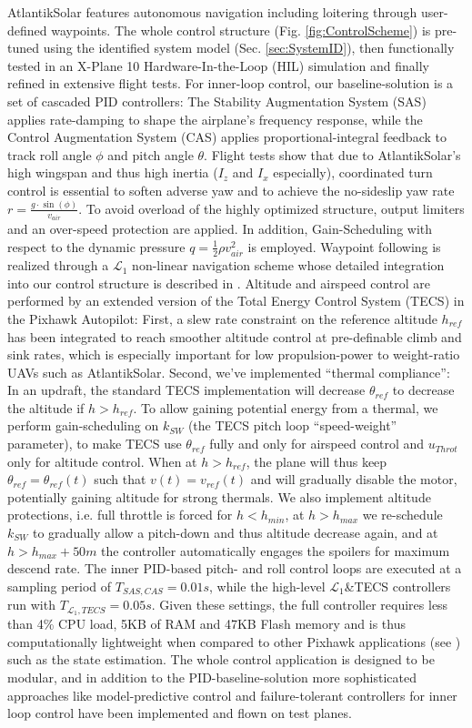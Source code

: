 AtlantikSolar features autonomous navigation including loitering through user-defined waypoints. The whole control structure (Fig. \ref{fig:ControlScheme}) is pre-tuned using the identified system model (Sec. \ref{sec:SystemID}), then functionally tested in an X-Plane 10 Hardware-In-the-Loop (HIL) simulation and finally refined in extensive flight tests. For inner-loop control, our baseline-solution is a set of cascaded PID controllers: The Stability Augmentation System (SAS) applies rate-damping to shape the airplane's frequency response, while the Control Augmentation System (CAS) applies proportional-integral feedback to track roll angle $\phi$ and pitch angle $\theta$. Flight tests show that due to AtlantikSolar's high wingspan and thus high inertia ($I_z$ and $I_x$ especially), coordinated turn control is essential to soften adverse yaw and to achieve the no-sideslip yaw rate $r=\frac{g\cdot \sin(\phi)}{v_{air}}$. To avoid overload of the highly optimized structure, output limiters and an over-speed protection are applied. In addition, Gain-Scheduling with respect to the dynamic pressure $q=\frac{1}{2}\rho v^{2}_{air}$ is employed. Waypoint following is realized through a $\mathcal{L}_1$ non-linear navigation scheme whose detailed integration into our control structure is described in \cite{Oettershagen_MED14_L1MPC}. Altitude and airspeed control are performed by an extended version of the Total Energy Control System (TECS) in the Pixhawk Autopilot\cite{PixhawkWebsite}: First, a slew rate constraint on the reference altitude $h_{ref}$ has been integrated to reach smoother altitude control at pre-definable climb and sink rates, which is especially important for low propulsion-power to weight-ratio UAVs such as AtlantikSolar. Second, we've implemented ``thermal compliance'': In an updraft, the standard TECS implementation will decrease $\theta_{ref}$ to decrease the altitude if $h>h_{ref}$. To allow gaining potential energy from a thermal, we perform gain-scheduling on $k_{SW}$ (the TECS pitch loop ``speed-weight'' parameter), to make TECS use $\theta_{ref}$ fully and only for airspeed control and $u_{Throt}$ only for altitude control. When at $h>h_{ref}$, the plane will thus keep $\theta_{ref}=\theta_{ref}(t)$  such that $v(t)=v_{ref}(t)$ and will gradually disable the motor, potentially gaining altitude for strong thermals. We also implement altitude protections, i.e. full throttle is forced for $h<h_{min}$, at $h>h_{max}$ we re-schedule $k_{SW}$ to gradually allow a pitch-down and thus altitude decrease again, and at $h>h_{max}+50m$ the controller automatically engages the spoilers for maximum descend rate. The inner PID-based pitch- and roll control loops are executed at a sampling period of $T_{SAS,CAS}=0.01s$, while the high-level $\mathcal{L}_1$\&TECS controllers run with $T_{\mathcal{L}_1,TECS}=0.05s$. Given these settings, the full controller requires less than 4\% CPU load, 5KB of RAM and 47KB Flash memory and is thus computationally lightweight when compared to other Pixhawk applications (see \cite{Oettershagen_MED14_L1MPC}) such as the state estimation. The whole control application is designed to be modular, and in addition to the PID-baseline-solution more sophisticated approaches like model-predictive control \cite{Oettershagen_MED14_L1MPC} and failure-tolerant controllers \cite{Mosimann_FT} for inner loop control have been implemented and flown on test planes.
